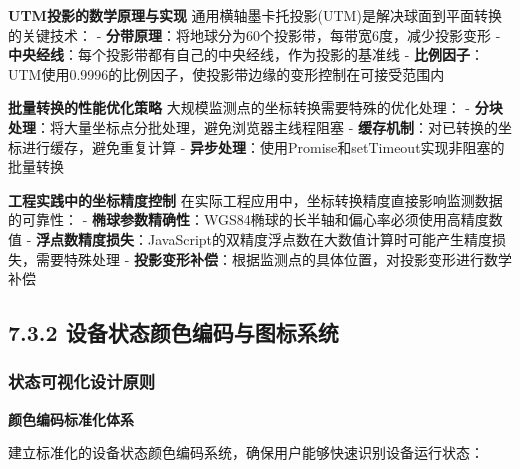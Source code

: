 \textbf{UTM投影的数学原理与实现} 通用横轴墨卡托投影(UTM)是解决球面到平面转换的关键技术： - \textbf{分带原理}：将地球分为60个投影带，每带宽6度，减少投影变形 - \textbf{中央经线}：每个投影带都有自己的中央经线，作为投影的基准线 - \textbf{比例因子}：UTM使用0.9996的比例因子，使投影带边缘的变形控制在可接受范围内

\textbf{批量转换的性能优化策略} 大规模监测点的坐标转换需要特殊的优化处理： - \textbf{分块处理}：将大量坐标点分批处理，避免浏览器主线程阻塞 - \textbf{缓存机制}：对已转换的坐标进行缓存，避免重复计算 - \textbf{异步处理}：使用Promise和setTimeout实现非阻塞的批量转换

\textbf{工程实践中的坐标精度控制} 在实际工程应用中，坐标转换精度直接影响监测数据的可靠性： - \textbf{椭球参数精确性}：WGS84椭球的长半轴和偏心率必须使用高精度数值 - \textbf{浮点数精度损失}：JavaScript的双精度浮点数在大数值计算时可能产生精度损失，需要特殊处理 - \textbf{投影变形补偿}：根据监测点的具体位置，对投影变形进行数学补偿

\subsection{7.3.2 设备状态颜色编码与图标系统}\label{ux8bbeux5907ux72b6ux6001ux989cux8272ux7f16ux7801ux4e0eux56feux6807ux7cfbux7edf}

\subsubsection{状态可视化设计原则}\label{ux72b6ux6001ux53efux89c6ux5316ux8bbeux8ba1ux539fux5219}

\textbf{颜色编码标准化体系}

建立标准化的设备状态颜色编码系统，确保用户能够快速识别设备运行状态：

